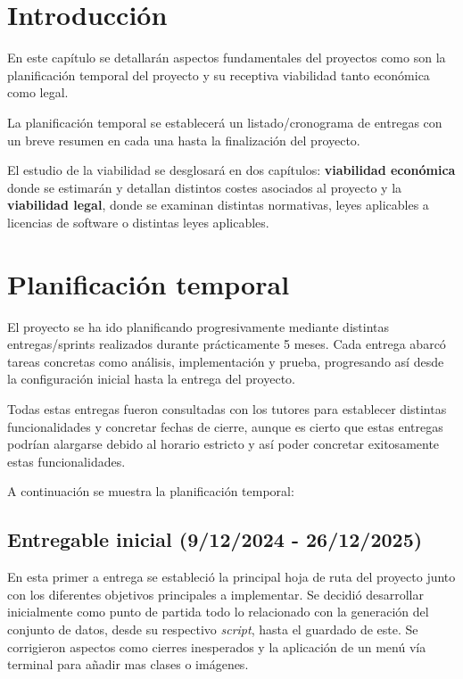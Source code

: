 
\section{Introducción}
En este capítulo se detallarán aspectos fundamentales del proyectos como son la planificación temporal del proyecto y su receptiva viabilidad tanto económica como legal. 

La planificación temporal se establecerá un listado/cronograma de entregas con un breve resumen en cada una hasta la finalización del proyecto.

El estudio de la viabilidad se desglosará en dos capítulos: \textbf{viabilidad económica} donde se estimarán y detallan distintos costes asociados al proyecto y la \textbf{viabilidad legal}, donde se examinan distintas normativas, leyes aplicables a licencias de software o distintas leyes aplicables.

\section{Planificación temporal}
El proyecto se ha ido planificando progresivamente mediante distintas entregas/sprints realizados durante prácticamente 5 meses. Cada entrega abarcó tareas concretas como análisis, implementación y prueba, progresando así desde la configuración inicial hasta la entrega del proyecto. 

Todas estas entregas fueron consultadas con los tutores para establecer distintas funcionalidades y concretar fechas de cierre, aunque es cierto que estas entregas podrían alargarse debido al horario estricto y así poder concretar exitosamente estas funcionalidades.

A continuación se muestra la planificación temporal:


\subsection{Entregable inicial (9/12/2024 - 26/12/2025)}
En esta primer a entrega se estableció la principal hoja de ruta del proyecto junto con los diferentes objetivos principales a implementar. Se decidió desarrollar inicialmente como punto de partida todo lo relacionado con la generación del conjunto de datos, desde su respectivo \textit{script}, hasta el guardado de este. Se corrigieron aspectos como cierres inesperados y la aplicación de un menú vía terminal para añadir mas clases o imágenes.

